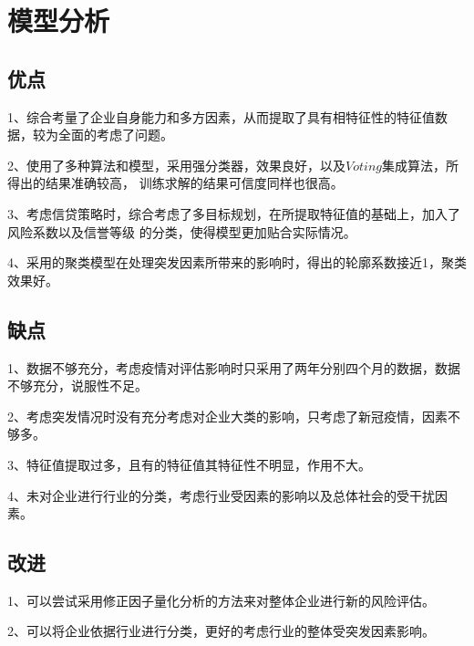 \documentclass[UTF8]{ctexart}
\begin{document}
\section{模型分析}
\subsection{优点}

1、综合考量了企业自身能力和多方因素，从而提取了具有相特征性的特征值数据，较为全面的考虑了问题。

2、使用了多种算法和模型，采用强分类器，效果良好，以及$Voting$集成算法，所得出的结果准确较高，
训练求解的结果可信度同样也很高。

3、考虑信贷策略时，综合考虑了多目标规划，在所提取特征值的基础上，加入了风险系数以及信誉等级
的分类，使得模型更加贴合实际情况。

4、采用的聚类模型在处理突发因素所带来的影响时，得出的轮廓系数接近1，聚类效果好。

\subsection{缺点}
1、数据不够充分，考虑疫情对评估影响时只采用了两年分别四个月的数据，数据不够充分，说服性不足。

2、考虑突发情况时没有充分考虑对企业大类的影响，只考虑了新冠疫情，因素不够多。

3、特征值提取过多，且有的特征值其特征性不明显，作用不大。

4、未对企业进行行业的分类，考虑行业受因素的影响以及总体社会的受干扰因素。

\subsection{改进}
1、可以尝试采用修正因子量化分析的方法来对整体企业进行新的风险评估。

2、可以将企业依据行业进行分类，更好的考虑行业的整体受突发因素影响。


% 



		
\end{document}
